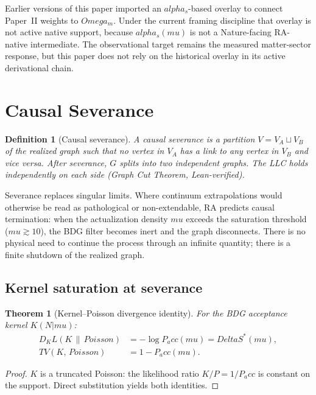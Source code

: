 \documentclass[11pt]{article}
\def\Delta{Delta}%
\def\Omega{Omega}%
\def\mu{mu}%
\def\alpha{alpha}%
\def\mathrm#1{#1}%
\def\mathbf#1{#1}%
\def\Pacc{P_acc}%
\def\Dkl{D_KL}%
\def\TV{TV}%
\newtheorem{definition}{Definition}
\newtheorem{theorem}{Theorem}
\newcommand{\Pacc}{P_{\mathrm{acc}}}
\newcommand{\Dkl}{D_{\mathrm{KL}}}
\newcommand{\TV}{\mathrm{TV}}
\begin{document}
Earlier versions of this paper imported an $\alpha_s$-based overlay to connect Paper~II weights to $\Omega_m$. Under the current framing discipline that overlay is not active native support, because $\alpha_s(\mu)$ is not a Nature-facing RA-native intermediate. The observational target remains the measured matter-sector response, but this paper does not rely on the historical overlay in its active derivational chain.

\section{Causal Severance}
\label{sec:severance}

\begin{definition}[Causal severance]
A causal severance is a partition $V=V_A\sqcup V_B$ of the realized graph such that no vertex in $V_A$ has a link to any vertex in $V_B$ and vice versa. After severance, $G$ splits into two independent graphs. The LLC holds independently on each side (Graph Cut Theorem, Lean-verified).
\end{definition}

Severance replaces singular limits. Where continuum extrapolations would otherwise be read as pathological or non-extendable, RA predicts causal termination: when the actualization density $\mu$ exceeds the saturation threshold ($\mu\gtrsim 10$), the BDG filter becomes inert and the graph disconnects. There is no physical need to continue the process through an infinite quantity; there is a finite shutdown of the realized graph.

\subsection{Kernel saturation at severance}

\begin{theorem}[Kernel--Poisson divergence identity]
\label{thm:kl}
For the BDG acceptance kernel $K(\mathbf{N}|\mu)$:
\begin{align}
\Dkl(K\,\|\,\mathrm{Poisson}) &= -\log\Pacc(\mu) = \Delta S^*(\mu), \\
\TV(K,\,\mathrm{Poisson}) &= 1-\Pacc(\mu).
\end{align}
\end{theorem}
\begin{proof}
$K$ is a truncated Poisson: the likelihood ratio $K/P=1/\Pacc$ is constant on the support. Direct substitution yields both identities.
\end{proof}
\end{document}
